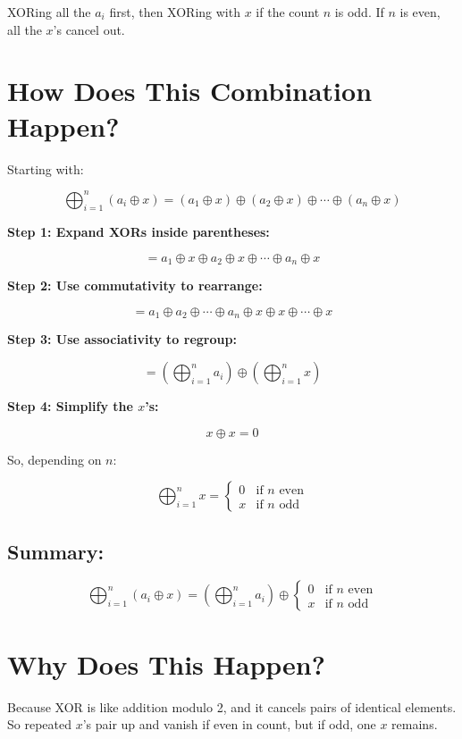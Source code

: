 \documentclass{article}
\begin{document}
XORing all the \( a_i \) first, then XORing with \( x \) if the count \( n \) is odd.  
If \( n \) is even, all the \( x \)'s cancel out.

\section*{How Does This Combination Happen?}

Starting with:

\[
\bigoplus_{i=1}^{n} (a_i \oplus x) = (a_1 \oplus x) \oplus (a_2 \oplus x) \oplus \cdots \oplus (a_n \oplus x)
\]

\textbf{Step 1: Expand XORs inside parentheses:}

\[
= a_1 \oplus x \oplus a_2 \oplus x \oplus \cdots \oplus a_n \oplus x
\]

\textbf{Step 2: Use commutativity to rearrange:}

\[
= a_1 \oplus a_2 \oplus \cdots \oplus a_n \oplus x \oplus x \oplus \cdots \oplus x
\]

\textbf{Step 3: Use associativity to regroup:}

\[
= \left( \bigoplus_{i=1}^{n} a_i \right) \oplus \left( \bigoplus_{i=1}^{n} x \right)
\]

\textbf{Step 4: Simplify the \( x \)'s:}

\[
x \oplus x = 0
\]

So, depending on \( n \):

\[
\bigoplus_{i=1}^{n} x = 
\begin{cases}
0 & \text{if } n \text{ even} \\
x & \text{if } n \text{ odd}
\end{cases}
\]

\subsection*{Summary:}

\[
\bigoplus_{i=1}^{n} (a_i \oplus x) = 
\left( \bigoplus_{i=1}^{n} a_i \right) \oplus 
\begin{cases}
0 & \text{if } n \text{ even} \\
x & \text{if } n \text{ odd}
\end{cases}
\]

\section*{Why Does This Happen?}

Because XOR is like addition modulo 2, and it cancels pairs of identical elements.  
So repeated \( x \)'s pair up and vanish if even in count, but if odd, one \( x \) remains.
\end{document}
